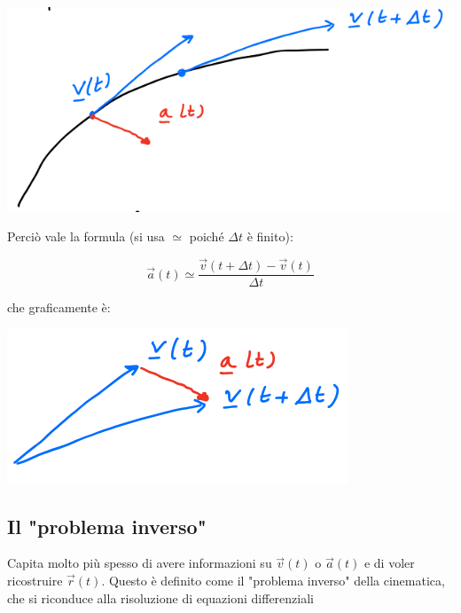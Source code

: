 \documentclass{subfiles}
\begin{document}
\includegraphics[width=\columnwidth]{rappresentazione-accelerazione-grafica-differenza}

\noindent
Perciò vale la formula (si usa $\simeq$ poiché $\Delta t$ è finito):

$$
\vec{a}(t) \simeq \frac{\vec{v}(t + \Delta t) - \vec{v}(t)}{\Delta t}
$$

\noindent
che graficamente è:

\includegraphics[width=\columnwidth]{rappresentazione-accelerazione-grafica-approssimazione}

\subsection{Il "problema inverso"}

Capita molto più spesso di avere informazioni su $\vec{v}(t)$ o $\vec{a}(t)$ e di voler ricostruire $\vec{r}(t)$. Questo è definito come il "problema inverso" della cinematica, che si riconduce alla risoluzione di equazioni differenziali
\end{document}
